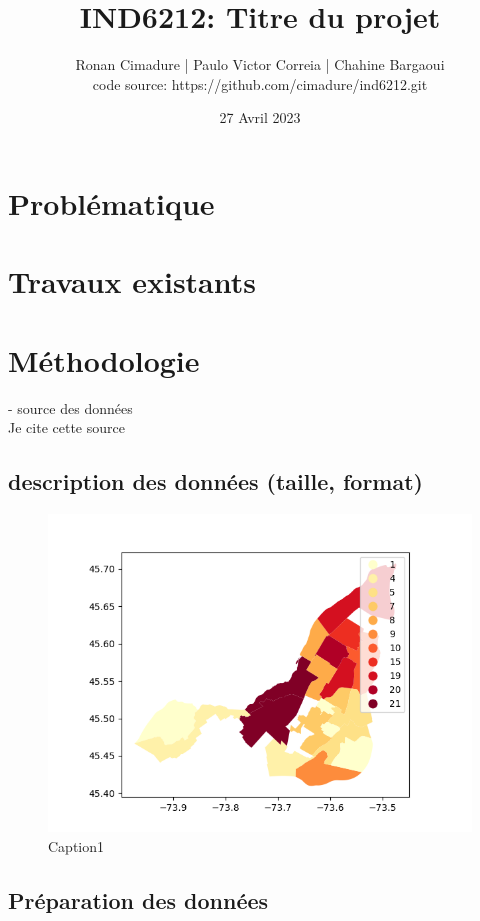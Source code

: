 \documentclass[12pt]{article}
\title{IND6212: Titre du projet}
\author{Ronan Cimadure | Paulo Victor Correia | Chahine Bargaoui  \\ code source: https://github.com/cimadure/ind6212.git}
\date{27 Avril 2023}
\begin{document}
\maketitle

\section{Problématique}
\blindtext[3]
\section{Travaux existants}
\blindtext[1]
\section{Méthodologie}
- source des données \\
Je cite cette source \cite{example-article}\\
\subsection{description des données (taille, format)}


\begin{figure}
    \includegraphics[width=1\linewidth]{media/nombre_de_secteurs_par_arrondissement.png} 
    \caption{Caption1}
    \label{fig:wrapfig}
\end{figure}

\subsection{Préparation des données}
\end{document}
